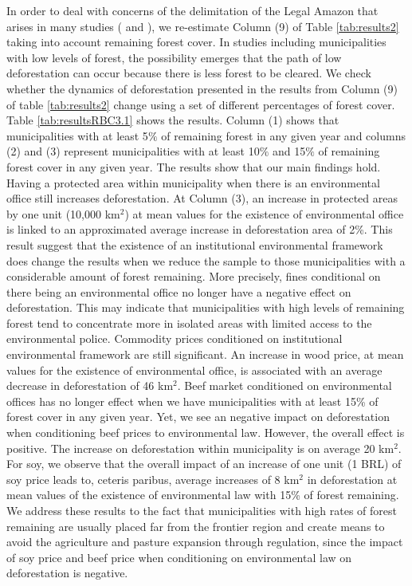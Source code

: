 In order to deal with concerns of the delimitation of the Legal Amazon that arises in many studies (\citet{hargrave_kis-katos_2012} and \citet{NEPSTAD}), we re-estimate Column (9) of Table \ref{tab:results2} taking into account remaining forest cover. In studies including municipalities with low levels of forest, the possibility emerges that the path of low deforestation can occur because there is less forest to be cleared. We check whether the dynamics of deforestation presented in the results from Column (9) of table \ref{tab:results2} change using a set of different percentages of forest cover. Table \ref{tab:resultsRBC3.1} shows the results.  Column (1) shows that municipalities with at least 5$\%$ of remaining forest in any given year and columns (2) and (3) represent municipalities with at least 10$\%$ and 15$\%$ of remaining forest cover in any given year. The results show that our main findings hold. Having a protected area within municipality when there is an environmental office still increases deforestation. At Column (3), an increase in protected areas by one unit (10,000 km$^{2}$) at mean values for the existence of environmental office is linked to an approximated average increase in deforestation area of 2\%. This result suggest that the existence of an institutional environmental framework does change the results when we reduce the sample to those municipalities with a considerable amount of forest remaining. More precisely, fines conditional on there being an environmental office no longer have a negative effect on deforestation. This may indicate that municipalities with high levels of remaining forest tend to concentrate more in isolated areas with limited access to the environmental police. Commodity prices conditioned on institutional environmental framework are still significant. An increase in wood price, at mean values for the existence of environmental office, is associated with an average decrease in deforestation of 46 km$^{2}$. Beef market conditioned on environmental offices has no longer effect when we have municipalities with at least 15\% of forest cover in any given year. Yet, we see an negative impact on deforestation when conditioning beef prices to environmental law. However, the overall effect is positive. The increase on deforestation within municipality is on average 20 km$^{2}$. For soy, we observe that the overall impact of an increase of one unit (1 BRL) of soy price leads to, ceteris paribus, average increases of 8 km$^{2}$ in deforestation at mean values of the existence of environmental law with 15\% of forest remaining. We address these results to the fact that municipalities with high rates of forest remaining are usually placed far from the frontier region and create means to avoid the agriculture and pasture expansion through regulation, since the impact of soy price and beef price when conditioning on environmental law on deforestation is negative. 


